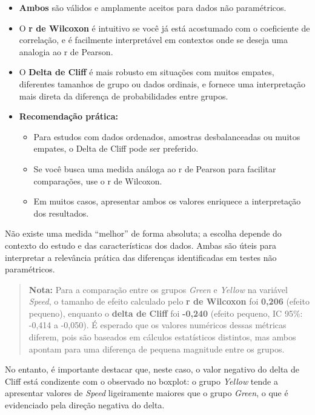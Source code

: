 \documentclass[
]{book}
\providecommand{\tightlist}{%
  \setlength{\itemsep}{0pt}\setlength{\parskip}{0pt}}
\begin{document}
\begin{itemize}
\tightlist
\item
  \textbf{Ambos} são válidos e amplamente aceitos para dados não paramétricos.
\item
  O \textbf{r de Wilcoxon} é intuitivo se você já está acostumado com o coeficiente de correlação, e é facilmente interpretável em contextos onde se deseja uma analogia ao r de Pearson.
\item
  O \textbf{Delta de Cliff} é mais robusto em situações com muitos empates, diferentes tamanhos de grupo ou dados ordinais, e fornece uma interpretação mais direta da diferença de probabilidades entre grupos.
\item
  \textbf{Recomendação prática:}

  \begin{itemize}
  \tightlist
  \item
    Para estudos com dados ordenados, amostras desbalanceadas ou muitos empates, o Delta de Cliff pode ser preferido.
  \item
    Se você busca uma medida análoga ao r de Pearson para facilitar comparações, use o r de Wilcoxon.
  \item
    Em muitos casos, apresentar ambos os valores enriquece a interpretação dos resultados.
  \end{itemize}
\end{itemize}

Não existe uma medida ``melhor'' de forma absoluta; a escolha depende do contexto do estudo e das características dos dados. Ambas são úteis para interpretar a relevância prática das diferenças identificadas em testes não paramétricos.

\begin{quote}
\textbf{Nota:} Para a comparação entre os grupos \emph{Green} e \emph{Yellow} na variável \emph{Speed}, o tamanho de efeito calculado pelo \textbf{r de Wilcoxon} foi \textbf{0,206} (efeito pequeno), enquanto o \textbf{delta de Cliff} foi \textbf{-0,240} (efeito pequeno, IC 95\%: -0,414 a -0,050). É esperado que os valores numéricos dessas métricas diferem, pois são baseados em cálculos estatísticos distintos, mas ambos apontam para uma diferença de pequena magnitude entre os grupos.
\end{quote}

No entanto, é importante destacar que, neste caso, o valor negativo do delta de Cliff está condizente com o observado no boxplot: o grupo \emph{Yellow} tende a apresentar valores de \emph{Speed} ligeiramente maiores que o grupo \emph{Green}, o que é evidenciado pela direção negativa do delta.
\end{document}
